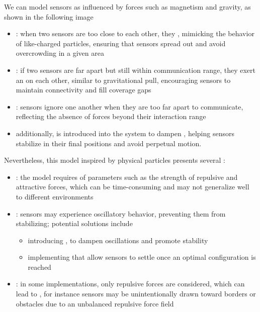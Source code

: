 \documentclass[a4paper, 12pt]{report}
\begin{document}
    We can model sensors as  influenced by forces such as magnetism and gravity, as shown in the following image


    \begin{itemize}
        \item {}: when two sensors are too close to each other, they , mimicking the behavior of like-charged particles, ensuring that sensors spread out and avoid overcrowding in a given area
        \item {}: if two sensors are far apart but still within communication range, they exert an  on each other, similar to gravitational pull, encouraging sensors to maintain connectivity and fill coverage gaps
        \item {}: sensors ignore one another when they are too far apart to communicate, reflecting the absence of forces beyond their interaction range
        \item additionally,  is introduced into the system to dampen , helping sensors stabilize in their final positions and avoid perpetual motion.  
    \end{itemize}

    Nevertheless, this model inspired by physical particles presents several :

    \begin{itemize}
        \item {}: the model requires  of parameters such as the strength of repulsive and attractive forces, which can be time-consuming and may not generalize well to different environments
    \item {}: sensors may experience oscillatory behavior, preventing them from stabilizing; potential solutions include
            \begin{itemize}
                \item introducing , to dampen oscillations and promote stability
                \item implementing  that allow sensors to settle once an optimal configuration is reached
            \end{itemize}
        \item {}: in some implementations, only repulsive forces are considered, which can lead to , for instance sensors may be unintentionally drawn toward borders or obstacles due to an unbalanced repulsive force field
    \end{itemize}
\end{document}
